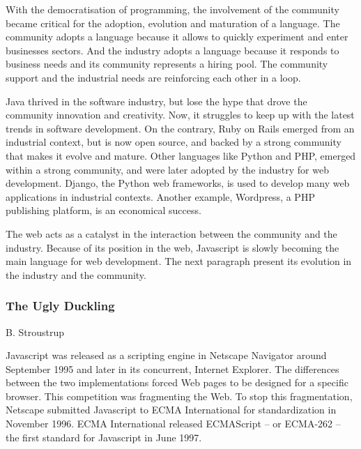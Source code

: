 With the democratisation of programming, the involvement of the community became critical for the adoption, evolution and maturation of a language.
The community adopts a language because it allows to quickly experiment and enter businesses sectors.
And the industry adopts a language because it responds to business needs and its community represents a hiring pool.
The community support and the industrial needs are reinforcing each other in a loop.

Java thrived in the software industry, but lose the hype that drove the community innovation and creativity.
Now, it struggles to keep up with the latest trends in software development.
On the contrary, Ruby on Rails emerged from an industrial context, but is now open source, and backed by a strong community that makes it evolve and mature.
Other languages like Python and PHP, emerged within a strong community, and were later adopted by the industry for web development.
Django, the Python web frameworks, is used to develop many web applications in industrial contexts.
Another example, Wordpress, a PHP publishing platform, is an economical success.

The web acts as a catalyst in the interaction between the community and the industry.
Because of its position in the web, Javascript is slowly becoming the main language for web development.
The next paragraph present its evolution in the industry and the community.

\subsubsection{The Ugly Duckling}

%
{B. Stroustrup}


Javascript was released as a scripting engine in Netscape Navigator around September 1995 and later in its concurrent, Internet Explorer.
The differences between the two implementations forced Web pages to be designed for a specific browser.
This competition was fragmenting the Web.
To stop this fragmentation, Netscape submitted Javascript to ECMA International for standardization in November 1996.
ECMA International released  ECMAScript -- or ECMA-262 -- the first standard for Javascript in June 1997. %

